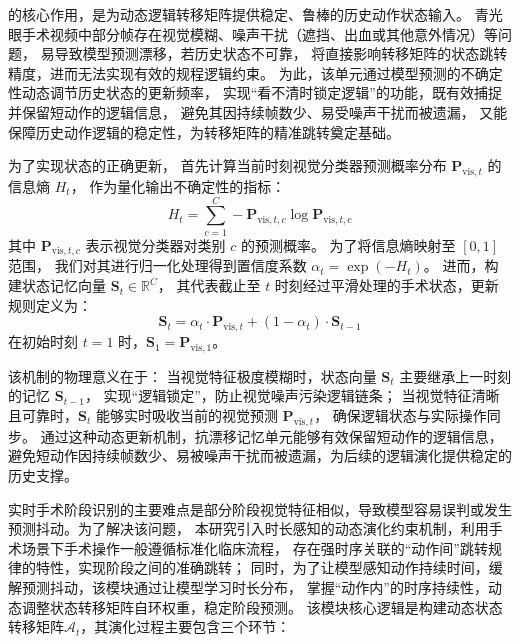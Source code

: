 \textbf{\memoryunit}\quad
\memoryunit
的核心作用，是为动态逻辑转移矩阵提供稳定、鲁棒的历史动作状态输入。
青光眼手术视频中部分帧存在视觉模糊、噪声干扰（遮挡、出血或其他意外情况）等问题，
易导致模型预测漂移，若历史状态不可靠，
将直接影响转移矩阵的状态跳转精度，进而无法实现有效的规程逻辑约束。
为此，该单元通过模型预测的不确定性动态调节历史状态的更新频率，
实现“看不清时锁定逻辑”的功能，既有效捕捉并保留短动作的逻辑信息，
避免其因持续帧数少、易受噪声干扰而被遗漏，
又能保障历史动作逻辑的稳定性，为转移矩阵的精准跳转奠定基础。

为了实现状态的正确更新，
首先计算当前时刻视觉分类器预测概率分布 \(\mathbf{P}_{\mathrm{vis}, t}\) 的信息熵 \(H_t\)，
作为量化输出不确定性的指标：
\begin{equation}
H_t = \sum_{c=1}^C - \mathbf{P}_{\mathrm{vis}, t, c} \log \mathbf{P}_{\mathrm{vis}, t, c}
\label{eq:alg2_entropy}
\end{equation}
其中 \(\mathbf{P}_{\mathrm{vis}, t, c}\) 表示视觉分类器对类别 \(c\) 的预测概率。
为了将信息熵映射至 \([0, 1]\) 范围，
我们对其进行归一化处理得到置信度系数 \(\alpha_t = \exp(-H_t)\)。
进而，构建状态记忆向量 \(\mathbf{S}_t \in \mathbb{R}^C\)，
其代表截止至 \(t\) 时刻经过平滑处理的手术状态，更新规则定义为：
\begin{equation}
\mathbf{S}_t = \alpha_t \cdot \mathbf{P}_{\mathrm{vis}, t} +
 (1 - \alpha_t) \cdot \mathbf{S}_{t-1}
\label{eq:alg2_memory_update}
\end{equation}
在初始时刻 \(t=1\) 时，\(\mathbf{S}_1 = \mathbf{P}_{\mathrm{vis}, 1}\)。

该机制的物理意义在于：
当视觉特征极度模糊时，状态向量 \(\mathbf{S}_t\) 主要继承上一时刻的记忆 \(\mathbf{S}_{t-1}\)，
实现“逻辑锁定”，防止视觉噪声污染逻辑链条；
当视觉特征清晰且可靠时，\(\mathbf{S}_t\) 能够实时吸收当前的视觉预测 \(\mathbf{P}_{\mathrm{vis}, t}\)，
确保逻辑状态与实际操作同步。
通过这种动态更新机制，抗漂移记忆单元能够有效保留短动作的逻辑信息，
避免短动作因持续帧数少、易被噪声干扰而被遗漏，为后续的逻辑演化提供稳定的历史支撑。

\textbf{\evolution}\quad
实时手术阶段识别的主要难点是部分阶段视觉特征相似，导致模型容易误判或发生预测抖动。为了解决该问题，
本研究引入时长感知的动态演化约束机制，利用手术场景下手术操作一般遵循标准化临床流程，
存在强时序关联的“动作间”跳转规律的特性，实现阶段之间的准确跳转；
同时，为了让模型感知动作持续时间，缓解预测抖动，该模块通过让模型学习时长分布，
掌握“动作内”的时序持续性，动态调整状态转移矩阵自环权重，稳定阶段预测。
该模块核心逻辑是构建动态状态转移矩阵\(\mathcal{A}_t\)，其演化过程主要包含三个环节：

